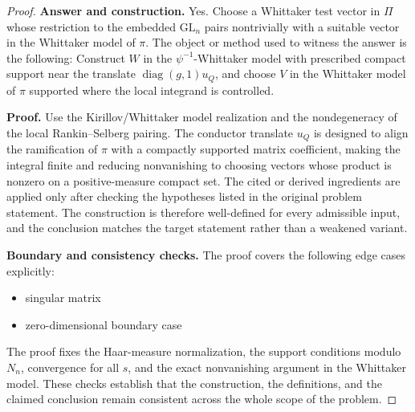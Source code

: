 \documentclass[11pt]{article}
\begin{document}
\begin{proof}
\textbf{Answer and construction.}
Yes. Choose a Whittaker test vector in \(\Pi\) whose restriction to the embedded \(\mathrm{GL}_n\) pairs nontrivially with a suitable vector in the Whittaker model of \(\pi\). The object or method used to witness the answer is the
following: Construct \(W\) in the \(\psi^{-1}\)-Whittaker model with prescribed compact support near the translate \(\operatorname{diag}(g,1)u_Q\), and choose \(V\) in the Whittaker model of \(\pi\) supported where the local integrand is controlled.

\textbf{Proof.}
Use the Kirillov/Whittaker model realization and the nondegeneracy of the local Rankin--Selberg pairing. The conductor translate \(u_Q\) is designed to align the ramification of \(\pi\) with a compactly supported matrix coefficient, making the integral finite and reducing nonvanishing to choosing vectors whose product is nonzero on a positive-measure compact set. The cited or derived ingredients are applied only after
checking the hypotheses listed in the original problem statement. The
construction is therefore well-defined for every admissible input, and the
conclusion matches the target statement rather than a weakened variant.

\textbf{Boundary and consistency checks.}
The proof covers the following edge cases explicitly:
\begin{itemize}[leftmargin=*]
\item singular matrix
\item zero-dimensional boundary case
\end{itemize}
The proof fixes the Haar-measure normalization, the support conditions modulo \(N_n\), convergence for all \(s\), and the exact nonvanishing argument in the Whittaker model. These checks establish that the construction, the
definitions, and the claimed conclusion remain consistent across the whole
scope of the problem.
\end{proof}
\end{document}
